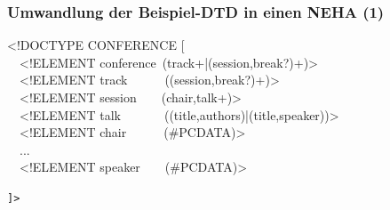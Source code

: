     \begin{frame}
      \frametitle{Umwandlung der Beispiel-DTD in einen NEHA (1)}

      \begin{exampleblock}{}
        \begin{footnotesize}
          \begin{ttfamily}
            <!DOCTYPE CONFERENCE [ \\
            ~~<!ELEMENT conference~(track+|(session,break?)+)>        \\
            ~~<!ELEMENT track~~~~~~((session,break?)+)>               \\
            ~~<!ELEMENT session~~~~(chair,talk+)>                     \\
            ~~<!ELEMENT talk~~~~~~~((title,authors)|(title,speaker))> \\
            ~~<!ELEMENT chair~~~~~~(\#PCDATA)>                        \\
            ~~...                                                     \\
            ~~<!ELEMENT speaker~~~~(\#PCDATA)>                        \\[-3pt]
          \end{ttfamily}
          \texttt{]>}
        \end{footnotesize}
      \end{exampleblock}


\end{frame}
